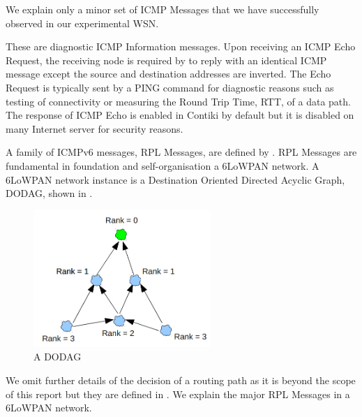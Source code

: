 We explain only a minor set of ICMP Messages that we have successfully observed in our experimental WSN.
\begin{description}[style=nextline]
	\item[\textbf{Echo Request and Reply Messages}]
	These are diagnostic ICMP Information messages. Upon receiving an ICMP Echo Request, the receiving node is required by \cite{rfc4443} to reply with an identical ICMP message except the source and destination addresses are inverted. The Echo Request is typically sent by a PING command for diagnostic reasons such as testing of connectivity or measuring the Round Trip Time, RTT, of a data path. The response of ICMP Echo is enabled in Contiki by default but it is disabled on many Internet server for security reasons.
	
	\item[\textbf{RPL Messages}]
	A family of ICMPv6 messages, RPL Messages, are defined by \cite{rfc6550}. RPL Messages are fundamental in foundation and self-organisation a 6LoWPAN network. A 6LoWPAN network instance is a Destination Oriented Directed Acyclic Graph, DODAG, shown in . 

	\begin{figure}[h!]
		\center
		\includegraphics[width=0.6\textwidth]{fig/dodag.png}
		\caption{A DODAG}
		\label{Fig: DODAG}
	\end{figure}
	
	We omit further details of the decision of a routing path as it is beyond the scope of this report but they are defined in \cite{rfc6550}. We explain the major RPL Messages in a 6LoWPAN network.
	

\end{description}
